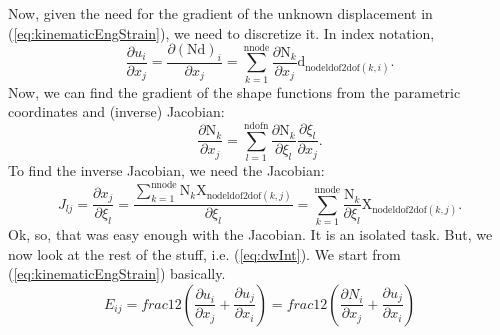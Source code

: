 \documentclass[12pt,a4paper]{article}
\makeatletter
\theoremstyle{remark} %
\newcommand{\comment}[1]{ }  %
\renewcommand{\cleardoublepage}{\clearpage\if@twoside \ifodd\c@page\else
	\hbox{}
	\vspace*{\fill}
	\thispagestyle{empty}
	\newpage
	\if@twocolumn\hbox{}\newpage\fi\fi\fi}
\numberwithin{equation}{section} %
\makeatother
\begin{document}
Now, given the need for the gradient of the unknown displacement in (\ref{eq:kinematicEngStrain}), we need to discretize it. In index notation,
\begin{equation}
	\frac{\partial u_i}{\partial x_j} = \frac{\partial (\mathrm N \mathrm d)_i}{\partial x_j} = \sum_{k = 1}^{\text{nnode}} \frac{\partial \mathrm N_k}{\partial x_j} \mathrm d_{\text{nodeldof2dof}(k, i)} .
\end{equation}
%
Now, we can find the gradient of the shape functions from the parametric coordinates and (inverse) Jacobian:
\begin{equation}
	\frac{\partial \mathrm N_k}{\partial x_j} = \sum_{l = 1}^{\text{ndofn}} \frac{\partial \mathrm N_k}{\partial \xi_l} \frac{\partial \xi_l}{\partial x_j}.
\end{equation}
To find the inverse Jacobian, we need the Jacobian:
\begin{equation}
	J_{lj} = \frac{\partial x_j}{\partial \xi_l} = \frac{\sum_{k = 1}^{\text{nnode}} \mathrm N_k \mathrm X_{\text{nodeldof2dof}(k, j)}}{\partial \xi_l} = \sum_{k = 1}^{\text{nnode}} \frac{\mathrm N_k}{\partial \xi_l} \mathrm X_{\text{nodeldof2dof}(k, j)} .
\end{equation}
%
Ok, so, that was easy enough with the Jacobian. It is an isolated task. But, we now look at the rest of the stuff, i.e. (\ref{eq:dwInt}). We start from (\ref{eq:kinematicEngStrain}) basically.
\begin{equation}
	E_{ij} = frac{1}{2} (\frac{\partial u_i}{\partial x_j} + \frac{\partial u_j}{\partial x_i}) =
	frac{1}{2} (\frac{\partial N_i}{\partial x_j} + \frac{\partial u_j}{\partial x_i})	
\end{equation}







\comment{
	\cleardoublepage
	\addcontentsline{toc}{section}{References}
	\printbibliography
	
}
\end{document}
